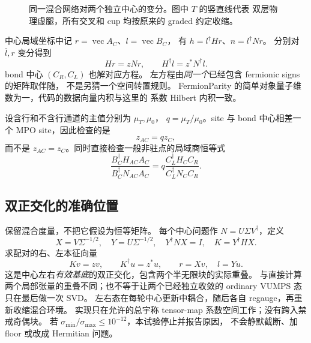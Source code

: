 \begin{figure}[htbp]
\centering
{}
\caption{同一混合网络对两个独立中心的变分。图中 $T$ 的竖直线代表
双层物理虚腿，所有交叉和 cup 均按原来的 graded 约定收缩。}
\end{figure}

中心局域坐标中记 $r=\operatorname{vec}A_C$、$l=\operatorname{vec}B_C$，
有 $h=l^\dagger H r$、$n=l^\dagger N r$。
分别对 $\bar l,r$ 变分得到
\begin{equation}
 Hr=zNr,\qquad H^\dagger l=z^*N^\dagger l.
\label{eq:independent-pencil}
\end{equation}
bond 中心 $(C_R,C_L)$ 也解对应方程。
左方程由\emph{同一个}已经包含 fermionic signs 的矩阵取伴随，
不是另猜一个空间转置规则。
FermionParity 的简单对象量子维数为一，代码的数据向量内积与这里的
系数 Hilbert 内积一致。

设含行和不含行通道的主值分别为 $\mu_T,\mu_0$，
$q=\mu_T/\mu_0$。site 与 bond 中心相差一个 MPO site，因此检查的是
\[
 z_{AC}=q z_C,
\]
而不是 $z_{AC}=z_C$。同时直接检查一般非驻点的局域商恒等式
\[
 \frac{B_C^\dagger H_{AC}A_C}{B_C^\dagger N_{AC}A_C}
 =q\frac{C_L^\dagger H_C C_R}{C_L^\dagger N_C C_R}.
\]

\subsection{双正交化的准确位置}
保留混合度量，不把它假设为恒等矩阵。
每个中心问题作 $N=U\Sigma V^\dagger$，定义
\[
 X=V\Sigma^{-1/2},\quad Y=U\Sigma^{-1/2},\quad
 Y^\dagger NX=I,\quad K=Y^\dagger HX.
\]
求配对的右、左本征向量
\[
 Kv=zv,\qquad K^\dagger u=z^*u,
 \qquad r=Xv,\quad l=Yu.
\]
这是中心左右\emph{有效基底}的双正交化，包含两个半无限块的实际重叠。
与直接计算两个局部张量的重叠不同；也不等于让两个已经独立收敛的
ordinary VUMPS 态只在最后做一次 SVD。
左右态在每轮中心更新中耦合，随后各自 regauge，再重新收缩混合环境。
实现只在允许的总宇称 tensor-map 系数空间工作；没有跨入禁戒奇偶块。
若 $\sigma_{\min}/\sigma_{\max}\le10^{-12}$，本试验停止并报告原因，
不会静默截断、加 floor 或改成 Hermitian 问题。


